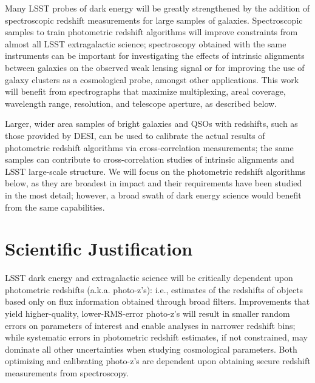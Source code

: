 
\label{chap:photoz}

Many LSST probes of dark energy will be greatly strengthened by the addition of spectroscopic redshift measurements for large samples of galaxies.  Spectroscopic samples to train photometric redshift algorithms will improve constraints from almost all LSST extragalactic science; spectroscopy obtained with the same instruments can be important for investigating the effects of intrinsic alignments between galaxies on the observed weak lensing signal or for improving the use of galaxy clusters as a cosmological probe, amongst other applications.  This work will benefit from spectrographs that maximize multiplexing, areal coverage, wavelength range, resolution, and telescope aperture, as described below.

Larger, wider area samples of bright galaxies and QSOs with redshifts, such as those provided by DESI, can be used to calibrate the actual results of photometric redshift algorithms via cross-correlation measurements; the same samples can contribute to cross-correlation studies of intrinsic alignments and LSST large-scale structure.  We will focus on the photometric redshift algorithms below, as they are broadest in impact and their requirements have been studied in the most detail; however, a broad swath of dark energy science would benefit from the same capabilities.

\section{Scientific Justification}

\label{sec:photoz_just}


LSST dark energy and extragalactic science will be critically dependent upon photometric redshifts (a.k.a. photo-z's): i.e., estimates of the redshifts of objects based only on flux information obtained through broad filters.  Improvements that yield higher-quality, lower-RMS-error photo-z's will result in smaller random errors on parameters of interest and enable analyses in narrower redshift bins; while systematic errors in photometric redshift estimates, if not constrained, may dominate all other uncertainties when studying cosmological parameters.  Both optimizing and calibrating photo-z's are dependent upon obtaining secure redshift measurements from spectroscopy.

